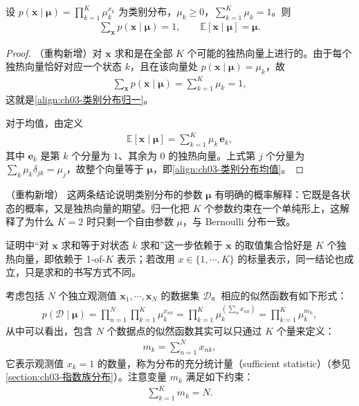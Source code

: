 \documentclass[../../main.tex]{subfiles}
\begin{document}
\begin{proposition}[类别分布的归一化与均值]\label{proposition:ch03-类别分布矩}
设 $p(\boldsymbol{x}\mid\boldsymbol{\mu})=\prod_{k=1}^{K}\mu_k^{x_k}$ 为类别分布，$\mu_k\geqslant0$，$\sum_{k=1}^{K}\mu_k=1$。则
\begin{align*}
\sum_{\boldsymbol{x}}p(\boldsymbol{x}\mid\boldsymbol{\mu})=1,\qquad \mathbb{E}[\boldsymbol{x}\mid\boldsymbol{\mu}]=\boldsymbol{\mu}.
\end{align*}
\end{proposition}
\begin{proof}
（重构新增）对 $\boldsymbol{x}$ 求和是在全部 $K$ 个可能的独热向量上进行的。由于每个独热向量恰好对应一个状态 $k$，且在该向量处 $p(\boldsymbol{x}\mid\boldsymbol{\mu})=\mu_k$，故
\begin{align*}
\sum_{\boldsymbol{x}}p(\boldsymbol{x}\mid\boldsymbol{\mu})=\sum_{k=1}^{K}\mu_k=1,
\end{align*}
这就是\eqref{align:ch03-类别分布归一}。

对于均值，由定义
\begin{align*}
\mathbb{E}[\boldsymbol{x}\mid\boldsymbol{\mu}]=\sum_{k=1}^{K}\mu_k\,\boldsymbol{e}_k,
\end{align*}
其中 $\boldsymbol{e}_k$ 是第 $k$ 个分量为 $1$、其余为 $0$ 的独热向量。上式第 $j$ 个分量为 $\sum_k\mu_k\delta_{jk}=\mu_j$，故整个向量等于 $\boldsymbol{\mu}$，即\eqref{align:ch03-类别分布均值}。
\end{proof}

\begin{remark}（重构新增）
这两条结论说明类别分布的参数 $\boldsymbol{\mu}$ 有明确的概率解释：它既是各状态的概率，又是独热向量的期望。归一化把 $K$ 个参数约束在一个单纯形上，这解释了为什么 $K=2$ 时只剩一个自由参数 $\mu$，与 Bernoulli 分布一致。

证明中“对 $\boldsymbol{x}$ 求和等于对状态 $k$ 求和”这一步依赖于 $\boldsymbol{x}$ 的取值集合恰好是 $K$ 个独热向量，即依赖于 1-of-$K$ 表示；若改用 $x\in\{1,\cdots,K\}$ 的标量表示，同一结论也成立，只是求和的书写方式不同。
\end{remark}

考虑包括 $N$ 个独立观测值 $\boldsymbol{x}_1,\cdots,\boldsymbol{x}_N$ 的数据集 $\mathcal{D}$。相应的似然函数有如下形式：
\begin{align}
p(\mathcal{D}\mid\boldsymbol{\mu})=\prod_{n=1}^{N}\prod_{k=1}^{K}\mu_k^{x_{nk}}=\prod_{k=1}^{K}\mu_k^{\left(\sum_{n}x_{nk}\right)}=\prod_{k=1}^{K}\mu_k^{m_k},
\label{align:ch03-类别似然}
\end{align}
从中可以看出，包含 $N$ 个数据点的似然函数其实可以只通过 $K$ 个量来定义：
\begin{align}
m_k=\sum_{n=1}^{N}x_{nk},
\label{align:ch03-充分统计量}
\end{align}
它表示观测值 $x_k=1$ 的数量，称为分布的充分统计量（sufficient statistic）（参见\cref{section:ch03-指数族分布}）。注意变量 $m_k$ 满足如下约束：
\begin{align}
\sum_{k=1}^{K}m_k=N.
\label{align:ch03-多项计数约束}
\end{align}
\end{document}
